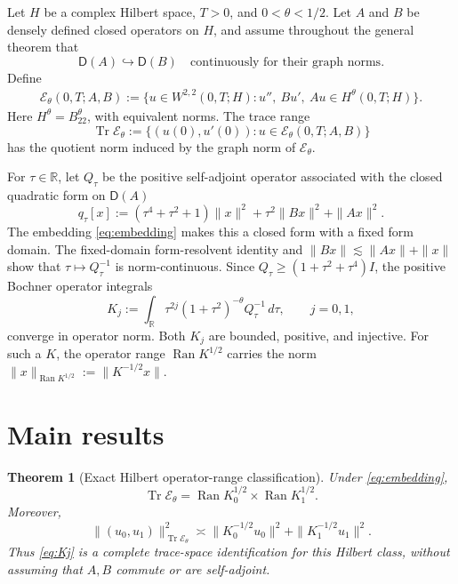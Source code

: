 \documentclass[11pt]{article}
\newtheorem{theorem}{Theorem}
\theoremstyle{remark}
\newcommand{\R}{\mathbb R}
\newcommand{\cE}{\mathcal E}
\newcommand{\Tr}{\operatorname{Tr}}
\newcommand{\Ran}{\operatorname{Ran}}
\newcommand{\Dom}{\mathsf D}
\newcommand{\asympC}{\mathrel{\asymp}}
\begin{document}
Let $H$ be a complex Hilbert space, $T>0$, and $0<\theta<1/2$.  Let $A$ and
$B$ be densely defined closed operators on $H$, and assume throughout the
general theorem that
\begin{equation}\label{eq:embedding}
 \Dom(A)\hookrightarrow\Dom(B)
 \quad\text{continuously for their graph norms.}
\end{equation}
Define
\begin{align*}
 \cE_\theta(0,T;A,B):=\{u\in W^{2,2}(0,T;H):
 u'',\ Bu',\ Au\in H^\theta(0,T;H)\}.
\end{align*}
Here $H^\theta=B^\theta_{22}$, with equivalent norms.  The trace range
\[
 \Tr\cE_\theta:=\{(u(0),u'(0)):u\in\cE_\theta(0,T;A,B)\}
\]
has the quotient norm induced by the graph norm of $\cE_\theta$.

For $\tau\in\R$, let $Q_\tau$ be the positive self-adjoint operator associated
with the closed quadratic form on $\Dom(A)$
\begin{equation}\label{eq:formpencil}
 q_\tau[x]
 :=(\tau^4+\tau^2+1)\|x\|^2+\tau^2\|Bx\|^2+\|Ax\|^2.
\end{equation}
The embedding \eqref{eq:embedding} makes this a closed form with a fixed form
domain.  The fixed-domain form-resolvent identity and
$\|Bx\|\lesssim\|Ax\|+\|x\|$ show that $\tau\mapsto Q_\tau^{-1}$ is
norm-continuous.  Since $Q_\tau\ge(1+\tau^2+\tau^4)I$, the positive Bochner
operator integrals
\begin{equation}\label{eq:Kj}
 K_j:=\int_{\R}
 \tau^{2j}(1+\tau^2)^{-\theta}Q_\tau^{-1}\,d\tau,
 \qquad j=0,1,
\end{equation}
converge in operator norm.  Both $K_j$ are bounded, positive, and injective.
For such a $K$, the operator range $\Ran K^{1/2}$ carries the norm
$\|x\|_{\Ran K^{1/2}}:=\|K^{-1/2}x\|$.

\section{Main results}

\begin{theorem}[Exact Hilbert operator-range classification]\label{thm:range}
Under \eqref{eq:embedding},
\begin{equation}\label{eq:rangeanswer}
 \boxed{\quad
 \Tr\cE_\theta
 =\Ran K_0^{1/2}\times\Ran K_1^{1/2}.
 \quad}
\end{equation}
Moreover,
\[
 \|(u_0,u_1)\|_{\Tr\cE_\theta}^2
 \asympC
 \|K_0^{-1/2}u_0\|^2+\|K_1^{-1/2}u_1\|^2.
\]
Thus \eqref{eq:Kj} is a complete trace-space identification for this Hilbert
class, without assuming that $A,B$ commute or are self-adjoint.
\end{theorem}
\end{document}
